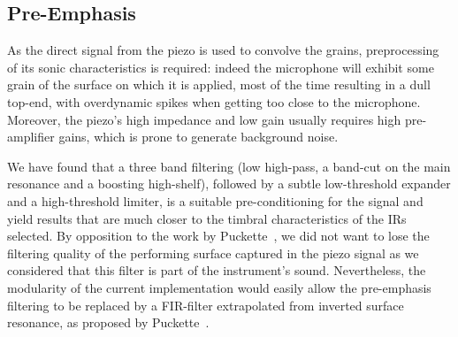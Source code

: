 \subsection{Pre-Emphasis}\label{sec:preemph}

As the direct signal from the piezo is used to convolve the grains, preprocessing of its sonic characteristics is required: indeed the microphone will exhibit some grain of the surface on which it is applied, most of the time resulting in a dull top-end, with overdynamic spikes when getting too close to the microphone. Moreover, the piezo's high impedance and low gain usually requires high pre-amplifier gains, which is prone to generate background noise. 

We have found that a three band filtering (low high-pass, a band-cut on the main resonance and a boosting high-shelf), followed by a subtle low-threshold expander and a high-threshold limiter, is a suitable pre-conditioning for the signal and yield results that are much closer to the timbral characteristics of the IRs selected. By opposition to the work by Puckette~\cite{Puckette-icmc2011-infuriating-nonlinear-reverberator}, we did not want to lose the filtering quality of the performing surface captured in the piezo signal as we considered that this filter is part 
%
%
of the instrument's sound. Nevertheless, the modularity of the current implementation would easily allow the pre-emphasis filtering to be replaced by a FIR-filter extrapolated from inverted surface resonance, as proposed by Puckette~\cite{Puckette-icmc2011-infuriating-nonlinear-reverberator}.

